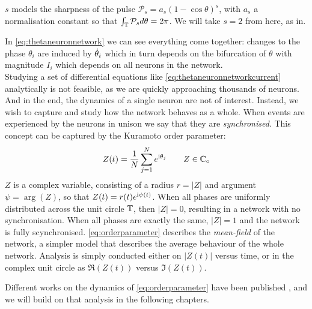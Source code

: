 $s$ models the sharpness of the pulse $\mathcal{P}_s = a_s(1 - \cos \theta)^s$, with $a_s$ a normalisation constant so that $\int_{{\mathbb{T}}} \mathcal{P}_{s} d \theta=2 \pi$. We will take $s=2$ from here, as in\cite{Luke2013, OttAntonsen2017, Martens2020}. 

In \eqref{eq:thetaneuronnetwork} we can see everything come together: changes to the phase $\theta_i$ are induced by ${\dot{\theta}}_i$ which in turn depends on the bifurcation of $\theta$ with magnitude $I_i$ which depends on all neurons in the network.\\


Studying a set of differential equations like \eqref{eq:thetaneuronnetworkcurrent} analytically is not feasible, as we are quickly approaching thousands of neurons. And in the end, the dynamics of a single neuron are not of interest. Instead, we wish to capture and study how the network behaves as a whole. When events are experienced by the neurons in unison we say that they are \textsl{synchronised}. This concept can be captured by the Kuramoto order parameter:
\begin{align}
Z(t) = \frac{1}{N} \sum_{j=1}^N e^{{\rm{i}}\theta_j}  \qquad Z \in \mathbb{C}_\circ \label{eq:orderparameter}
\end{align}
$Z$ is a complex variable, consisting of a radius $r = \rvert Z \rvert$ and argument $\psi = \arg \left( Z \right)$, so that $Z(t) = r(t) e^{{\rm{i}} \psi(t)}$. When all phases are uniformly distributed across the unit circle ${\mathbb{T}}$, then $\rvert Z \rvert = 0$, resulting in a network with no synchronisation. When all phases are exactly the same, $\rvert Z \rvert = 1$ and the network is fully scynchronised. \eqref{eq:orderparameter} describes the \textsl{mean-field} of the network, a simpler model that describes the average behaviour of the whole network. Analysis is simply conducted either on $ \rvert Z(t) \rvert$ versus time, or in the complex unit circle as $\Re (Z(t))$ versus $\Im (Z(t))$.

Different works on the dynamics of \eqref{eq:orderparameter} have been published \cite{Luke2013, Martens2020}, and we will build on that analysis in the following chapters.


